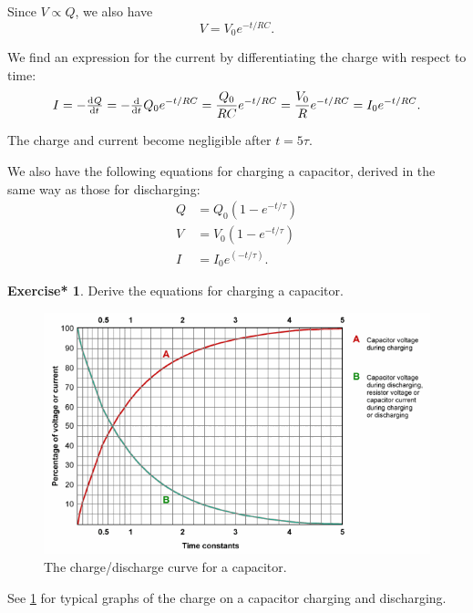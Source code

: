 \documentclass[a4paper]{amsbook}
\theoremstyle{definition}
\numberwithin{exercise}{chapter}
\newtheorem{exercise*}[exercise]{Exercise*}
\numberwithin{exercise}{chapter}
\begin{document}
Since $ V \propto Q $, we also have
\begin{equation}
  V = V_0 e^{-t/RC}.
\end{equation}

We find an expression for the current by differentiating the charge with respect to time:
\begin{equation}
  I = -\od{Q}{t} = -\od{}{t} Q_0 e^{-t/RC} = \frac{Q_0}{RC} e^{-t/RC} = \frac{V_0}{R} e^{-t/RC} = I_0 e^{-t/RC}.
\end{equation}

The charge and current become negligible after $ t = 5\tau $.

We also have the following equations for charging a capacitor, derived in the same way as those for discharging:
\begin{align}
  Q &= Q_0 (1 - e^{-t/\tau})\\
  V &= V_0 (1 - e^{-t/\tau})\\
  I &= I_0 e^{(-t/\tau)}.
\end{align}

\begin{exercise*}
  Derive the equations for charging a capacitor.
\end{exercise*}

\begin{figure}
  \centering
  \includegraphics[width=\textwidth]{capcharge}
  \caption{The charge/discharge curve for a capacitor.}\label{fig:capcharge}
\end{figure}

See \cref{fig:capcharge} for typical graphs of the charge on a capacitor charging and discharging.
\end{document}
